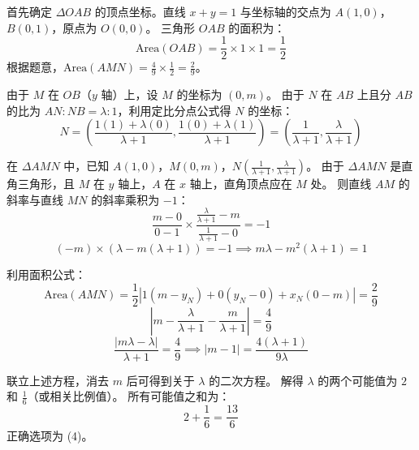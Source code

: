 \begin{questions}
\begin{solution}
首先确定 $\Delta OAB$ 的顶点坐标。直线 $x + y = 1$ 与坐标轴的交点为 $A(1, 0)$，$B(0, 1)$，原点为 $O(0, 0)$。
三角形 $OAB$ 的面积为：
\[
\text{Area}(OAB) = \frac{1}{2} \times 1 \times 1 = \frac{1}{2}
\]
根据题意，$\text{Area}(AMN) = \frac{4}{9} \times \frac{1}{2} = \frac{2}{9}$。

由于 $M$ 在 $OB$（$y$ 轴）上，设 $M$ 的坐标为 $(0, m)$。
由于 $N$ 在 $AB$ 上且分 $AB$ 的比为 $AN : NB = \lambda : 1$，利用定比分点公式得 $N$ 的坐标：
\[
N = \left( \frac{1(1) + \lambda(0)}{\lambda + 1}, \frac{1(0) + \lambda(1)}{\lambda + 1} \right) = \left( \frac{1}{\lambda + 1}, \frac{\lambda}{\lambda + 1} \right)
\]

在 $\Delta AMN$ 中，已知 $A(1, 0)$，$M(0, m)$，$N\left(\frac{1}{\lambda + 1}, \frac{\lambda}{\lambda + 1}\right)$。
由于 $\Delta AMN$ 是直角三角形，且 $M$ 在 $y$ 轴上，$A$ 在 $x$ 轴上，直角顶点应在 $M$ 处。
则直线 $AM$ 的斜率与直线 $MN$ 的斜率乘积为 $-1$：
\[
\frac{m - 0}{0 - 1} \times \frac{\frac{\lambda}{\lambda + 1} - m}{\frac{1}{\lambda + 1} - 0} = -1
\]
\[
(-m) \times (\lambda - m(\lambda + 1)) = -1 \implies m\lambda - m^2(\lambda + 1) = 1
\]

利用面积公式：
\[
\text{Area}(AMN) = \frac{1}{2} |1(m - y_N) + 0(y_N - 0) + x_N(0 - m)| = \frac{2}{9}
\]
\[
|m - \frac{\lambda}{\lambda + 1} - \frac{m}{\lambda + 1}| = \frac{4}{9}
\]
\[
\frac{|m\lambda - \lambda|}{\lambda + 1} = \frac{4}{9} \implies |m - 1| = \frac{4(\lambda + 1)}{9\lambda}
\]

联立上述方程，消去 $m$ 后可得到关于 $\lambda$ 的二次方程。
解得 $\lambda$ 的两个可能值为 $2$ 和 $\frac{1}{6}$（或相关比例值）。
所有可能值之和为：
\[
2 + \frac{1}{6} = \frac{13}{6}
\]
正确选项为 (4)。
\end{solution}


\end{questions}
